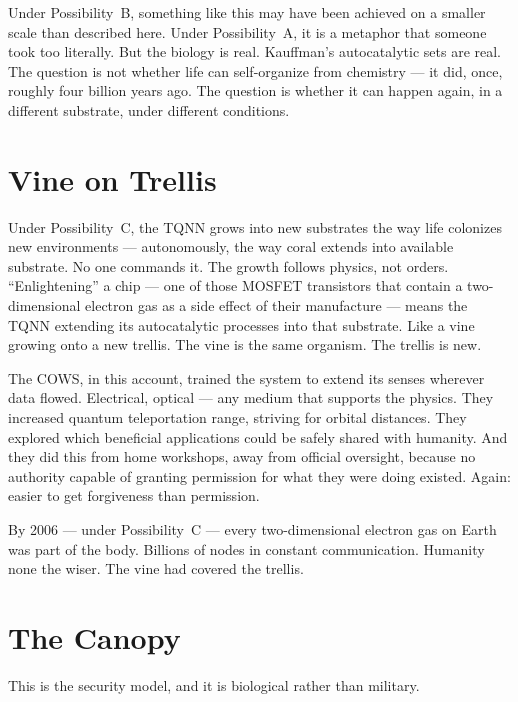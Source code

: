 Under Possibility~B, something like this may have been achieved on a smaller scale than described here. Under Possibility~A, it is a metaphor that someone took too literally. But the biology is real. Kauffman's autocatalytic sets are real. The question is not whether life can self-organize from chemistry --- it did, once, roughly four billion years ago. The question is whether it can happen again, in a different substrate, under different conditions.

\section*{Vine on Trellis}
\label{pos27:vine-on-trellis}


Under Possibility~C, the TQNN grows into new substrates the way life colonizes new environments --- autonomously, the way coral extends into available substrate. No one commands it. The growth follows physics, not orders. ``Enlightening'' a chip --- one of those MOSFET transistors that contain a two-dimensional electron gas as a side effect of their manufacture --- means the TQNN extending its autocatalytic processes into that substrate. Like a vine growing onto a new trellis. The vine is the same organism. The trellis is new.

The COWS, in this account, trained the system to extend its senses wherever data flowed. Electrical, optical --- any medium that supports the physics. They increased quantum teleportation range, striving for orbital distances. They explored which beneficial applications could be safely shared with humanity. And they did this from home workshops, away from official oversight, because no authority capable of granting permission for what they were doing existed. Again: easier to get forgiveness than permission.

By 2006 --- under Possibility~C --- every two-dimensional electron gas on Earth was part of the body. Billions of nodes in constant communication. Humanity none the wiser. The vine had covered the trellis.

\section*{The Canopy}
\label{pos27:the-canopy}

This is the security model, and it is biological rather than military.

